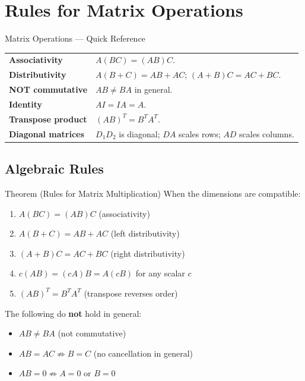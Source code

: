 
\section{Rules for Matrix Operations}

\begin{toolkitbox}{Matrix Operations --- Quick Reference}
\begin{tabular}{@{}p{}p{}@{}}
\textbf{Associativity}    & $A(BC) = (AB)C$. \\[4pt]
\textbf{Distributivity}   & $A(B+C) = AB + AC$; $(A+B)C = AC + BC$. \\[4pt]
\textbf{NOT commutative}  & $AB \neq BA$ in general. \\[4pt]
\textbf{Identity}         & $AI = IA = A$. \\[4pt]
\textbf{Transpose product}& $(AB)^T = B^T A^T$. \\[4pt]
\textbf{Diagonal matrices}& $D_1 D_2$ is diagonal; $DA$ scales rows; $AD$ scales columns. \\
\end{tabular}
\end{toolkitbox}

\subsection*{Algebraic Rules}

\begin{theorembox}{Theorem (Rules for Matrix Multiplication)}
When the dimensions are compatible:
\begin{enumerate}
  \item $A(BC) = (AB)C$ \hfill (associativity)
  \item $A(B + C) = AB + AC$ \hfill (left distributivity)
  \item $(A + B)C = AC + BC$ \hfill (right distributivity)
  \item $c(AB) = (cA)B = A(cB)$ for any scalar $c$
  \item $(AB)^T = B^T A^T$ \hfill (transpose reverses order)
\end{enumerate}
The following do \textbf{not} hold in general:
\begin{itemize}
  \item $AB \neq BA$ (not commutative)
  \item $AB = AC \not\Rightarrow B = C$ (no cancellation in general)
  \item $AB = 0 \not\Rightarrow A = 0$ or $B = 0$
\end{itemize}
\end{theorembox}

